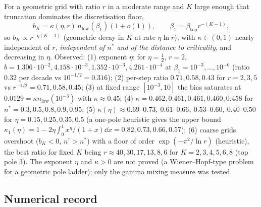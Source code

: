\begin{remark}[Conjecture]\label{conj:m-bias}\Nt{}
For a geometric grid with ratio $r$ in a moderate range and $K$ large enough that truncation dominates the discretisation floor,
\[
b_K=\kappa(\eta,r)\,n_{\mathrm{low}}(\beta_1)(1+o(1)),\qquad\beta_1=\beta_{\mathrm{top}}r^{-(K-1)},
\]
so $b_K\propto r^{-\eta(K-1)}$ (geometric decay in $K$ at rate $\eta\ln r$), with $\kappa\in(0,1)$ nearly independent of $r$, \emph{independent of $n^*$ and of the distance to criticality}, and decreasing in $\eta$. Observed: (1) exponent $\eta$: for $\eta=\tfrac12$, $r=2$, $b=1.306\cdot10^{-2},4.158\cdot10^{-3},1.352\cdot10^{-3},4.261\cdot10^{-4}$ at $\beta_1=10^{-3},\dots,10^{-6}$ (ratio $0.32$ per decade vs $10^{-1/2}=0.316$); (2) per-step ratio $0.71,0.58,0.43$ for $r=2,3,5$ vs $r^{-1/2}=0.71,0.58,0.45$; (3) at fixed range $[10^{-3},10]$ the bias saturates at $0.0129=\kappa n_{\mathrm{low}}(10^{-3})$ with $\kappa\approx0.45$; (4) $\kappa=0.462,0.461,0.461,0.460,0.458$ for $n^*=0.3,0.5,0.8,0.9,0.95$; (5) $\kappa(\eta)\approx0.69$--$0.73,\ 0.61$--$0.66,\ 0.53$--$0.60,\ 0.40$--$0.50$ for $\eta=0.15,0.25,0.35,0.5$ (a one-pole heuristic gives the upper bound $\kappa_1(\eta)=1-2\eta\int_0^1x^\eta/(1+x)\dd x=0.82,0.73,0.66,0.57$); (6) coarse grids overshoot ($b_K<0$, $n^\dagger>n^*$) with a floor of order $\exp(-\pi^2/\ln r)$ (heuristic), the best ratio for fixed $K$ being $r\approx40,30,17,13,8,6$ for $K=2,3,4,5,6,8$ (top pole $3$). The exponent $\eta$ and $\kappa>0$ are not proved (a Wiener--Hopf-type problem for a geometric pole ladder); only the gamma mixing measure was tested.
\end{remark}

\subsection{Numerical record}\label{sec:mis-num}

